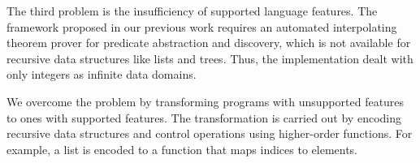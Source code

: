 %


%
%

The third problem is the insufficiency of supported language features.
The framework proposed in our previous work
requires an automated interpolating theorem prover for predicate
abstraction and discovery, which is not available for recursive
data structures like lists and trees. Thus, the implementation dealt
with only integers as infinite data domains.

We overcome the problem by transforming programs with unsupported
features to ones with supported features.  The transformation is carried
out by encoding recursive data structures and control operations using
higher-order functions.  For example, a list is encoded to a function
that maps indices to elements.


